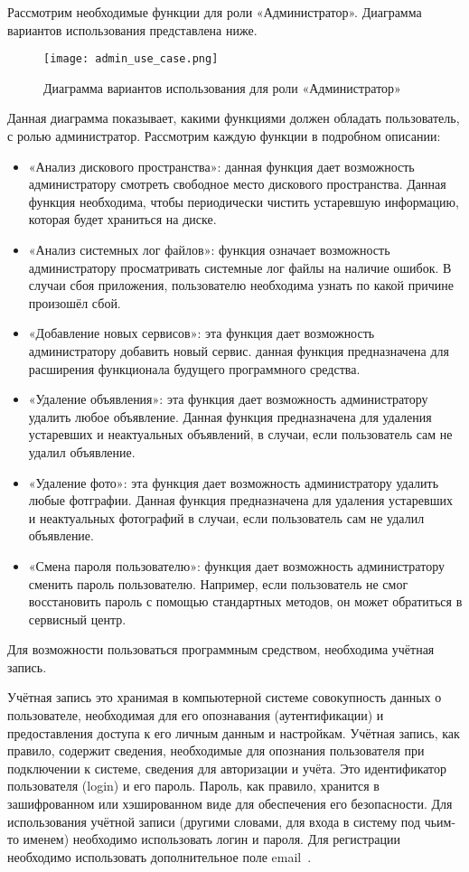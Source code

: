 Рассмотрим необходимые функции для роли «Администратор». Диаграмма вариантов использования представлена ниже.

\begin{figure}[!htb]
	\centering
	\texttt{[image: admin\_use\_case.png]}
	\caption{ Диаграмма вариантов использования для роли «Администратор»}
	\label{fig:arch_and_mod::lexer_flow}
	\clearpage
\end{figure}

Данная диаграмма показывает, какими функциями должен обладать пользователь, с ролью администратор.  Рассмотрим каждую функции в подробном описании:

\begin{itemize}
	\item «Анализ дискового пространства»: данная функция дает возможность администратору смотреть свободное место дискового пространства. Данная функция необходима, чтобы периодически чистить устаревшую информацию, которая будет храниться на диске.
	\item «Анализ системных лог файлов»: функция означает возможность администратору просматривать системные лог файлы на наличие ошибок. В случаи сбоя приложения, пользователю необходима узнать по какой причине произошёл сбой. 
	\item «Добавление новых сервисов»: эта функция дает возможность администратору добавить новый сервис. данная функция предназначена для расширения функционала будущего программного средства. 
	\item «Удаление объявления»: эта функция дает возможность администратору удалить любое объявление. Данная функция предназначена для удаления устаревших и неактуальных объявлений, в случаи, если пользователь сам не удалил объявление.
	\item «Удаление фото»: эта функция дает возможность администратору удалить любые фотграфии. Данная функция предназначена для удаления устаревших и неактуальных фотографий в случаи, если пользователь сам не удалил объявление.
	\item «Смена пароля пользователю»: функция дает возможность администратору сменить пароль пользователю. Например, если пользователь не смог восстановить пароль с помощью стандартных методов, он может обратиться в сервисный центр.
\end{itemize}

Для возможности пользоваться программным средством, необходима учётная запись.  

Учётная запись это хранимая в компьютерной системе совокупность данных о пользователе, необходимая для его опознавания (аутентификации) и предоставления доступа к его личным данным и настройкам. Учётная запись, как правило, содержит сведения, необходимые для опознания пользователя при подключении к системе, сведения для авторизации и учёта. Это идентификатор пользователя (login) и его пароль. Пароль, как правило, хранится в зашифрованном или хэшированном виде для обеспечения его безопасности. Для использования учётной записи (другими словами, для входа в систему под чьим-то именем) необходимо использовать логин и пароля. Для регистрации необходимо использовать дополнительное поле email~\cite{android_book}. 

